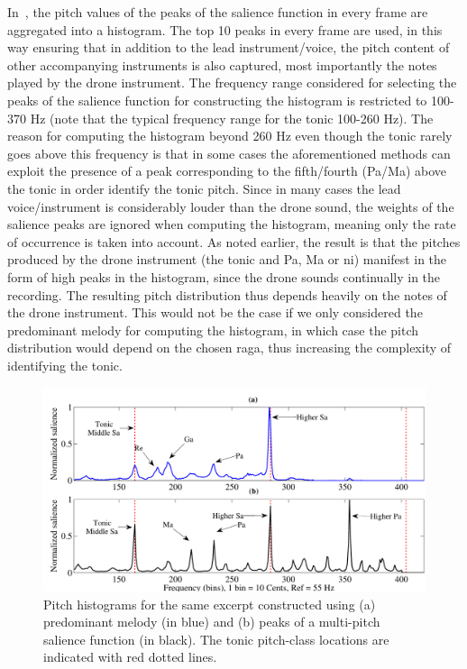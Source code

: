 {In~\cite{salamon2012multipitch,gulati2012two}, the pitch values of the peaks of the salience function in every frame are aggregated into a histogram. The top 10 peaks in every frame are used, in this way ensuring that in addition to the lead instrument/voice, the pitch content of other accompanying instruments is also captured, most importantly the notes played by the drone instrument. The frequency range considered for selecting the peaks of the salience function for constructing the histogram is restricted to 100-370 Hz (note that the typical frequency range for the tonic 100-260 Hz). The reason for computing the histogram beyond 260 Hz even though the tonic rarely goes above this frequency is that in some cases the aforementioned methods can exploit the presence of a peak corresponding to the fifth/fourth (Pa/Ma) above the tonic in order identify the tonic pitch. Since in many cases the lead voice/instrument is considerably louder than the drone sound, the weights of the salience peaks are ignored when computing the histogram, meaning only the rate of occurrence is taken into account. As noted earlier, the result is that the pitches produced by the drone instrument (the tonic and Pa, Ma or \gls{ni}) manifest in the form of high peaks in the histogram, since the drone sounds continually in the recording. The resulting pitch distribution thus depends heavily on the notes of the drone instrument. This would not be the case if we only considered the predominant melody for computing the histogram, in which case the pitch distribution would depend on the chosen \gls{raga}, thus increasing the complexity of identifying the tonic.

\begin{figure}
	\begin{center}
		\includegraphics[width=\figSizeNinety]{ch02_background/figures/Histogram_Melody_Multipitch.pdf}
	\end{center}
	\caption[Comparison of the histograms constructed using different methods]{Pitch histograms for the same excerpt constructed using (a) predominant melody (in blue) and (b) peaks of a multi-pitch salience function (in black). The tonic pitch-class locations are indicated with red dotted lines.}
	\label{fig:background_pitch_histograms_multipitch}
\end{figure}

}
